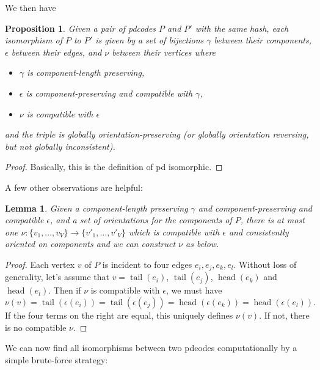 \documentclass[amsmath,secnumarabic,floatfix,amssymb,nofootinbib,nobibnotes,letterpaper,11pt,tightenlines,showkeys]{revtex4}
\newtheorem{lemma}[theorem]{Lemma}
\newtheorem{proposition}[theorem]{Proposition}
\theoremstyle{definition}
\newcommand{\head}{\operatorname{head}}
\newcommand{\tail}{\operatorname{tail}}
\begin{document}
We then have
\begin{proposition}
Given a pair of pdcodes $P$ and $P'$ with the same hash, each isomorphism of $P$ to $P'$ is given by a set of bijections $\gamma$ between their components, $\epsilon$ between their edges, and $\nu$ between their vertices where 
\begin{itemize}
\item $\gamma$ is component-length preserving,
\item $\epsilon$ is component-preserving and compatible with $\gamma$,
\item $\nu$ is compatible with $\epsilon$ 
\end{itemize}
and the triple is globally orientation-preserving (or globally orientation reversing, but not globally inconsistent).
\end{proposition}

\begin{proof}
Basically, this is the definition of pd isomorphic.
\end{proof}

A few other observations are helpful:
\begin{lemma}
Given a component-length preserving $\gamma$ and component-preserving and compatible $\epsilon$, and a set of orientations for the components of $P$, there is at most one $\nu : \{v_1, \dots, v_V\} \rightarrow \{v'_1,\dots,v'_V\}$ which is compatible with $\epsilon$ and consistently oriented on components and we can construct $\nu$ as below.
\end{lemma}

\begin{proof}
Each vertex $v$ of $P$ is incident to four edges $e_i, e_j, e_k, e_l$. Without loss of generality, let's assume that $v = \tail(e_i)$, $\tail(e_j)$, $\head(e_k)$ and $\head(e_l)$. Then if $\nu$ is compatible with $\epsilon$, we must have
\begin{equation*}
\nu(v) = \tail(\epsilon(e_i)) = \tail(\epsilon(e_j)) = \head(\epsilon(e_k)) = \head(\epsilon(e_l)).
\end{equation*}
If the four terms on the right are equal, this uniquely defines $\nu(v)$. If not, there is no compatible $\nu$. 
\end{proof}
 
We can now find all isomorphisms between two pdcodes computationally by a simple brute-force strategy: 
\end{document}
